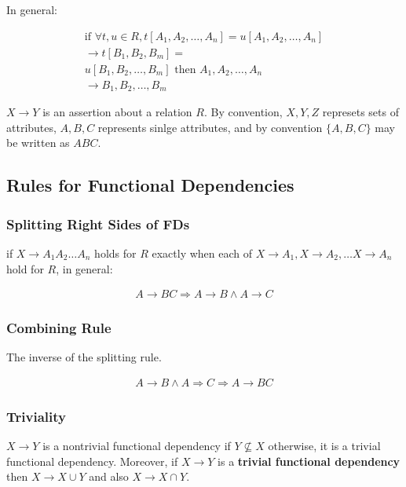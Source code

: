 \documentclass[11pt,a4paper,twocolumn]{book}
\begin{document}
In general:

\begin{multline}
\text{if } \forall t, u \in R, t[A_1, A_2, \hdots, A_n] = u[A_1, A_2, \hdots, A_n] \\ \rightarrow t[B_1, B_2, B_m] = \\u[B_1, B_2, \hdots, B_m] \text{ then } A_1, A_2, \hdots, A_n \\\rightarrow B_1, B_2, \hdots, B_m
\end{multline}

$X \rightarrow Y$ is an assertion about a relation $R$. By convention, $X, Y, Z$ represets sets of attributes, $A, B, C$ represents sinlge attributes, and by convention $\{A, B, C\}$ may be written as $ABC$.

\subsection{Rules for Functional Dependencies}

\subsubsection{Splitting Right Sides of FDs}

if $X \rightarrow A_1 A_2 \hdots A_n$ holds for $R$ exactly when each of $X \rightarrow A_1, X \rightarrow A_2, \hdots X \rightarrow A_n$ hold for $R$, in general:

\begin{align}
A \rightarrow BC \Rightarrow A \to B \land A \to C
\end{align}

\subsubsection{Combining Rule}

The inverse of the splitting rule.

\begin{align}
A \rightarrow B \land A \Rightarrow C \Rightarrow A \to BC
\end{align}

\subsubsection{Triviality}

$X \to Y$ is a nontrivial functional dependency if $Y \nsubseteq X$ otherwise, it is a trivial functional dependency. Moreover, if $X \to Y$ is a \textbf{trivial functional dependency} then $X \to X \cup Y$ and also $X \to X \cap Y$.
\end{document}

